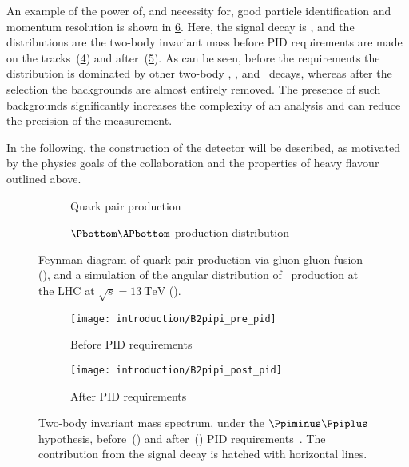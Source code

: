 An example of the power of, and necessity for, good particle identification and 
momentum resolution is shown in \cref{fig:intro:lhcb:pid_power}.
Here, the signal decay is \decay{\PBzero}{\pimpip}, and the distributions are 
the two-body invariant mass before \ac{PID} requirements are made on the 
tracks~(\ref{fig:intro:lhcb:pid_power:pre}) and 
after~(\ref{fig:intro:lhcb:pid_power:post}).
As can be seen, before the requirements the distribution is dominated by other 
two-body \PBzero, \PBs, and \PLambdab\ decays, whereas after the selection the 
backgrounds are almost entirely removed.
The presence of such backgrounds significantly increases the complexity of an 
analysis and can reduce the precision of the measurement.

In the following, the construction of the detector will be described, as 
motivated by the physics goals of the collaboration and the properties of heavy 
flavour outlined above.

\begin{figure}
  \begin{subfigure}[b]{0.4\textwidth}
    \centering
    
    \caption{Quark pair production}
    \label{fig:intro:lhcb:hf_production:gg_fusion}
  \end{subfigure}
  \begin{subfigure}[b]{0.6\textwidth}
    
    \caption{$\Pbottom\APbottom$ production distribution}
    \label{fig:intro:lhcb:hf_production:bbbar_angles}
  \end{subfigure}
  \caption{%
    Feynman diagram of quark pair production via gluon-gluon fusion 
    (), and a simulation of the 
    angular distribution of \bbbar\ production at the \ac{LHC} at $\sqrt{s} = 
    \SI{13}{\TeV}$ ().
  }
  \label{fig:intro:lhcb:hf_production}
\end{figure}

\begin{figure}
  \begin{subfigure}[b]{0.5\textwidth}
    \centering
    \texttt{[image: introduction/B2pipi\_pre\_pid]}
    \caption{Before \ac{PID} requirements}
    \label{fig:intro:lhcb:pid_power:pre}
  \end{subfigure}
  \begin{subfigure}[b]{0.5\textwidth}
    \centering
    \texttt{[image: introduction/B2pipi\_post\_pid]}
    \caption{After \ac{PID} requirements}
    \label{fig:intro:lhcb:pid_power:post}
  \end{subfigure}
  \caption{%
    Two-body invariant mass spectrum, under the $\pimpip$ hypothesis, 
    before~() and 
    after~() \ac{PID} 
    requirements~\cite{Aaij:2012as}.
    The contribution from the signal decay is hatched with horizontal lines.
  }
  \label{fig:intro:lhcb:pid_power}
\end{figure}

